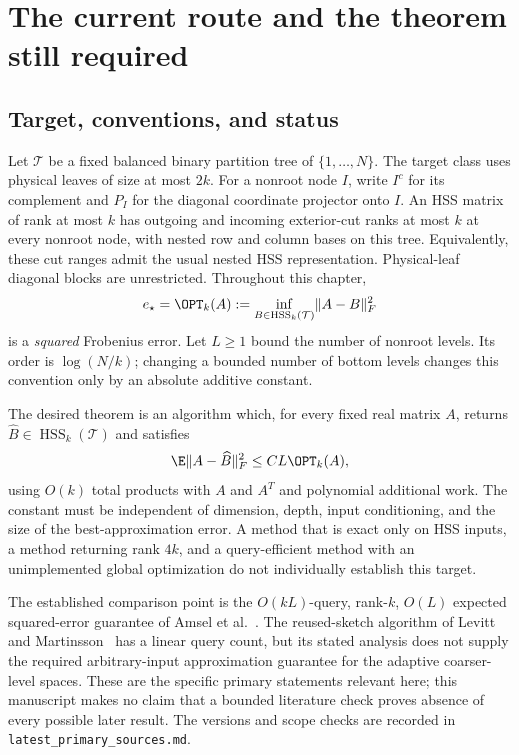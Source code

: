 \documentclass[11pt,oneside,openany,a4paper]{book}
\numberwithin{equation}{chapter}
\theoremstyle{definition}
\theoremstyle{remark}
\DeclareMathOperator{\HSS}{HSS}\DeclareMathOperator{\dist}{dist}
\newcommand{\sourcefile}[1]{{\small\nolinkurl{#1}}}
\begin{document}

\chapter{The current route and the theorem still required}
\label{upd:chap:current-route}

\section{Target, conventions, and status}

Let $\mathcal T$ be a fixed balanced binary partition tree of
$\{1,\ldots,N\}$.  The target class uses physical leaves of size at most
$2k$.  For a nonroot node $I$, write $I^c$ for its complement and $P_I$ for
the diagonal coordinate projector onto $I$.  An HSS matrix of rank at most
$k$ has outgoing and incoming exterior-cut ranks at most $k$ at every
nonroot node, with nested row and column bases on this tree.  Equivalently,
these cut ranges admit the usual nested HSS representation.  Physical-leaf
diagonal blocks are unrestricted.  Throughout this chapter,
\[
 e_\star=\OPT_k(A):=
 \inf_{B\in\HSS_k(\mathcal T)}\lVert A-B\rVert_F^2
\]
is a \emph{squared} Frobenius error.  Let $L\geq1$ bound the number of
nonroot levels.  Its order is $\log(N/k)$; changing a bounded number of
bottom levels changes this convention only by an absolute additive
constant.

The desired theorem is an algorithm which, for every fixed real matrix
$A$, returns $\widehat B\in\HSS_k(\mathcal T)$ and satisfies
\begin{equation}
 \E\lVert A-\widehat B\rVert_F^2\leq C L\OPT_k(A),
 \label{upd:eq:route-target}
\end{equation}
using $O(k)$ total products with $A$ and $A^T$ and polynomial additional
work.  The constant must be independent of dimension, depth, input
conditioning, and the size of the best-approximation error.  A method that
is exact only on HSS inputs, a method returning rank $4k$, and a
query-efficient method with an unimplemented global optimization do not
individually establish this target.

The established comparison point is the $O(kL)$-query, rank-$k$,
$O(L)$ expected squared-error guarantee of Amsel et al.\ \cite{AmselHSS}.
The reused-sketch algorithm of Levitt and Martinsson\ \cite{LM} has a
linear query count, but its stated analysis does not supply the required
arbitrary-input approximation guarantee for the adaptive coarser-level
spaces.  These are the specific primary statements relevant here; this
manuscript makes no claim that a bounded literature check proves absence
of every possible later result.  The versions and scope checks are
recorded in \sourcefile{latest_primary_sources.md}.
\end{document}
